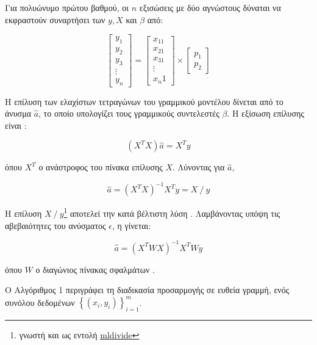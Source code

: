 \begin{refsection}
\noindent Για πολυώνυμο πρώτου βαθμού, οι $n$ εξισώσεις με δύο αγνώστους δύναται να εκφραστούν συναρτήσει των $y, X$ και $\beta$ από:

\[
\left[\begin{array}{c}
y_1\\
y_2\\
y_3\\
\vdots\\
y_n
\end{array}\right]
=
\left[\begin{array}{c}
x_11\\
x_21\\
x_31\\
\vdots\\
x_n1
\end{array}\right]
\times
\left[\begin{array}{c}
p_1\\
p_2
\end{array}\right]
\]

\noindent Η επίλυση των ελαχίστων τετραγώνων του γραμμικού μοντέλου  δίνεται από το άνυσμα $\hat{a}$, το οποίο υπολογίζει τους γραμμικούς συντελεστές $\beta$. Η εξίσωση επίλυσης είναι \cite{2012_Patera_BOOK_CHAPTER_LSQ}:

\begin{equation}
\left(X^TX\right)\hat{a} = X^Ty
\end{equation}

\noindent όπου $X^T$ ο ανάστροφος του πίνακα επίλυσης $X$. Λύνοντας για $\hat{a}$,

\begin{equation}\label{eqn:lsqsol}
\hat{a} = \left(X^T X\right)^{-1} X^T y = Χ \: / \: y 
\end{equation}

\noindent Η επίλυση $Χ \: / \: y$\footnote{γνωστή και ως εντολή \href{https://se.mathworks.com/help/matlab/ref/mldivide.html}{mldivide}} αποτελεί την κατά \matlab βέλτιστη λύση \cite{2012_Patera_BOOK_CHAPTER}. Λαμβάνοντας υπόψη τις αβεβαιότητες του ανύσματος $\epsilon$, η  γίνεται:

\begin{equation}
\hat{a} = \left(X^T W X\right)^{-1} X^T Wy 
\end{equation}

\noindent όπου $W$ ο διαγώνιος πίνακας σφαλμάτων \cite{1989_Lyons_BOOK_CHAPTER}.
\vspace{12pt}

\noindent Ο Αλγόριθμος 1 περιγράφει τη διαδικασία προσαρμογής σε ευθεία γραμμή, ενός συνόλου δεδομένων $\left\{(x_i, y_i)\right\}_{i = 1}^m$.


\end{refsection}
